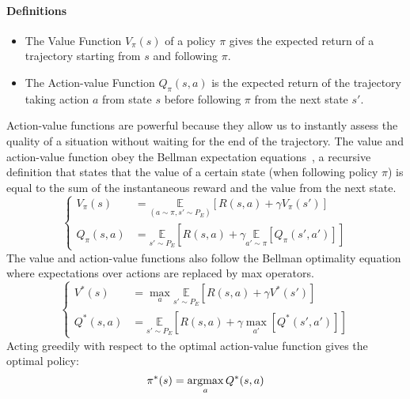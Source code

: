 \begin{tcolorbox}
\small
\paragraph{Definitions}
\begin{itemize}[noitemsep]
	 \item The \gls{Value Function} $V_\pi(s)$ of a policy $\pi$ gives the expected return of a trajectory starting from $s$ and following $\pi$. 
	 \item The \gls{Action-value Function} $Q_\pi(s,a)$ is the expected return of the trajectory taking action $a$ from state $s$ before following $\pi$ from the next state $s'$. 
\end{itemize}
\end{tcolorbox}
Action-value functions are powerful because they allow us to instantly assess the quality of a situation without waiting for the end of the trajectory. The value and action-value function obey the Bellman expectation equations~\citep{sutton1998intra}, a recursive definition that states that the value of a certain state (when following policy $\pi$) is equal to the sum of the instantaneous reward and the value from the next state.
\begin{equation}
\left\{
\begin{split}
	V_\pi(s) & = \underset{(a\sim\pi, s'\sim P_E)}{\mathbb{E}}\left[R(s,a) + \gamma V_\pi(s')\right]  \\
	Q_\pi(s,a) &= \underset{s'\sim P_E}{\mathbb{E}}\left[ R(s,a) + \gamma \underset{a' \sim \pi}{\mathbb{E}}[Q_\pi(s',a')]\right]
\end{split}
\right.	
\end{equation}
The value and action-value functions also follow the Bellman optimality equation where expectations over actions are replaced by max operators.
\begin{equation}
\left\{
\begin{split}
	V^*(s) & = \max_a\underset{s'\sim P_E}{\mathbb{E}}\left[R(s,a) + \gamma V^*(s')\right]  \\
	Q^*(s,a) &= \underset{s'\sim P_E}{\mathbb{E}}\left[ R(s,a) + \gamma \max_{a'}[Q^*(s',a')]\right]
\end{split}
\right.	
\end{equation}
Acting greedily with respect to the optimal action-value function gives the optimal policy:
\begin{equation}
\pi^*(s) = \operatorname*{argmax}_a Q^*(s,a)	
\end{equation}


